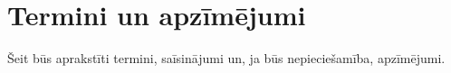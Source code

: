 \section {Termini un apzīmējumi}
Šeit būs aprakstīti termini, saīsinājumi un, ja būs nepieciešamība, apzīmējumi.